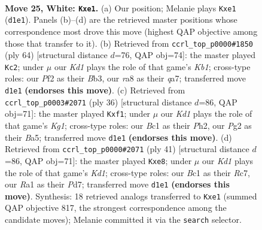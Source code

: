 \documentclass[11pt]{article}
\begin{document}
\clearpage

\begin{figure}[p]\centering
\begin{subfigure}{0.46\textwidth}\centering
\resizebox{\linewidth}{!}{%
\newchessgame
\chessboard[
  setfen={rn2k3/2Q5/3p4/pb1Pppb1/6p1/8/PPP2PP1/R1BKr3 w q - 0 25},
  showmover=false,
  pgfstyle=straightmove, color=movearrow, markmove={d1-e1}
]}
\caption{}
\end{subfigure}\hfill
\begin{subfigure}{0.46\textwidth}\centering
\resizebox{\linewidth}{!}{%
\newchessgame
\chessboard[
  setfen={3k3r/q1p1p3/7b/3P1P1p/7P/1BP5/1P2Q1P1/rKB1R3 w - - 1 33},
  showmover=false,
  pgfstyle=straightmove, color=movearrow, markmove={b1-c2}
]}
\caption{}
\end{subfigure}
\\[4pt]
\begin{subfigure}{0.46\textwidth}\centering
\resizebox{\linewidth}{!}{%
\newchessgame
\chessboard[
  setfen={r5k1/p1p3pp/4b3/B1p1P3/8/8/PPP3PP/R4rK1 w - - 0 19},
  showmover=false,
  pgfstyle=straightmove, color=movearrow, markmove={g1-f1}
]}
\caption{}
\end{subfigure}\hfill
\begin{subfigure}{0.46\textwidth}\centering
\resizebox{\linewidth}{!}{%
\newchessgame
\chessboard[
  setfen={3kR3/2rp1ppp/p2b4/1p1p4/5P2/P5P1/1PP4P/1K1R1B2 b - - 0 21},
  showmover=false,
  pgfstyle=straightmove, color=movearrow, markmove={d8-e8}
]}
\caption{}
\end{subfigure}
\caption{\textbf{Move 25, White: \texttt{Kxe1}.} (a) Our position; Melanie plays \texttt{Kxe1} (\texttt{d1e1}). Panels (b)--(d) are the retrieved master positions whose correspondence most drove this move (highest QAP objective among those that transfer to it). (b) Retrieved from \texttt{ccrl\_top\_p0000\#1850} (ply 64) [structural distance $d$=76, QAP obj=74]: the master played \texttt{Kc2}; under $\mu$ our \emph{Kd1} plays the role of that game's \emph{Kb1}; cross-type roles: our \emph{P}f2 as their \emph{B}b3, our \emph{r}a8 as their \emph{q}a7; transferred move \texttt{d1e1} \textbf{(endorses this move)}. (c) Retrieved from \texttt{ccrl\_top\_p0003\#2071} (ply 36) [structural distance $d$=86, QAP obj=71]: the master played \texttt{Kxf1}; under $\mu$ our \emph{Kd1} plays the role of that game's \emph{Kg1}; cross-type roles: our \emph{B}c1 as their \emph{P}h2, our \emph{P}g2 as their \emph{B}a5; transferred move \texttt{d1e1} \textbf{(endorses this move)}. (d) Retrieved from \texttt{ccrl\_top\_p0000\#2071} (ply 41) [structural distance $d$=86, QAP obj=71]: the master played \texttt{Kxe8}; under $\mu$ our \emph{Kd1} plays the role of that game's \emph{Kd1}; cross-type roles: our \emph{B}c1 as their \emph{R}c7, our \emph{R}a1 as their \emph{P}d7; transferred move \texttt{d1e1} \textbf{(endorses this move)}. Synthesis: 18 retrieved analogs transferred to \texttt{Kxe1} (summed QAP objective 817, the strongest correspondence among the candidate moves); Melanie committed it via the \texttt{search} selector.}
\label{fig:thought-m48}
\end{figure}
\end{document}
